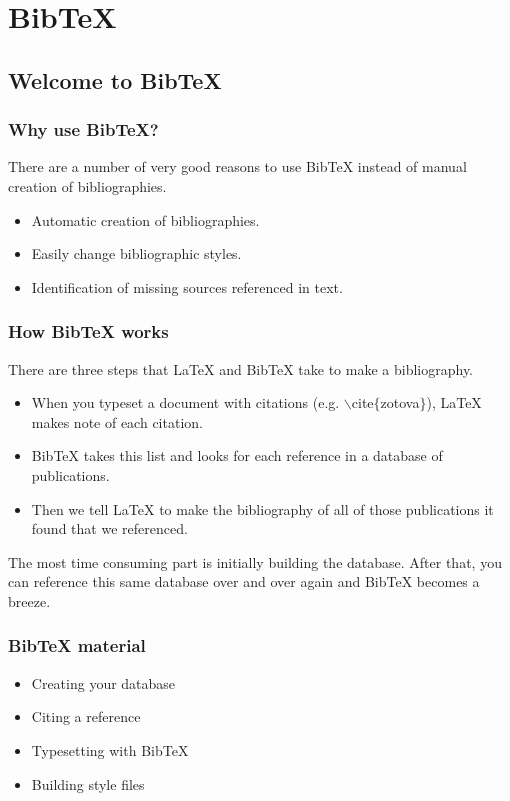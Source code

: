 \section[BibTeX]{BibTeX}



\subsection[Welcome to BibTeX]{Welcome to BibTeX}

\begin{frame}  \frametitle{Why use BibTeX?}
There are a number of very good reasons to use BibTeX instead of manual creation of bibliographies.
\begin{itemize}
\item Automatic creation of bibliographies.
\item Easily change bibliographic styles.
\item Identification of missing sources referenced in text.
\end{itemize}
\end{frame}

\begin{frame}  \frametitle{How BibTeX works}
There are three steps that LaTeX and BibTeX take to make a bibliography.
\begin{itemize}
\item When you typeset a document with citations (e.g. {\color{command}$\backslash$cite{\color{braces}$\{$}{\color{black}zotova}{\color{braces}$\}$}}), LaTeX makes note of each citation.
\item BibTeX takes this list and looks for each reference in a database of publications.
\item Then we tell LaTeX to make the bibliography of all of those publications it found that we referenced.
\end{itemize}
The most time consuming part is initially building the database. After that, you can reference this same database over and over again and BibTeX becomes a breeze.
\end{frame}

\begin{frame}  \frametitle{BibTeX material}
\begin{itemize}
\item Creating your database
\item Citing a reference
\item Typesetting with BibTeX
\item Building style files
\end{itemize}
\end{frame}

